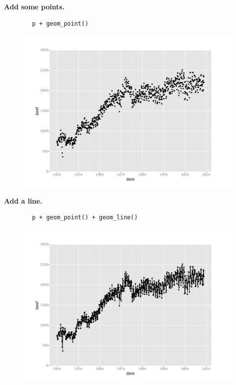 \documentclass{beamer}
\begin{document}
\begin{frame}[fragile]
\textbf{	Add some points.}
	\begin{framed}
		\begin{verbatim}
		p + geom_point()
		\end{verbatim}
	\end{framed}
	\begin{figure}
		\centering
		\includegraphics[width=0.7\linewidth]{Layers2}
	\end{figure}
	
	
\end{frame}
\begin{frame}[fragile]
\textbf{	Add a line.}
	\begin{framed}
		\begin{verbatim}
		p + geom_point() + geom_line()
		\end{verbatim}
	\end{framed}
	\begin{figure}
		\centering
		\includegraphics[width=0.7\linewidth]{Layers3}
	\end{figure}
	
\end{frame}
\end{document}
